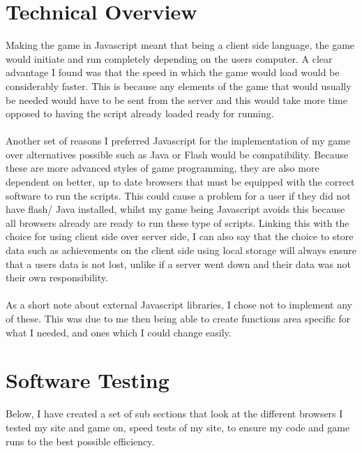 \documentclass[a4paper]{article}
\begin{document}
\section{Technical Overview}
Making the game in Javascript meant that being a client side language, the game
would initiate and run completely depending on the users computer. A clear
advantage I found was that the speed in which the game would load would be
considerably faster. This is because any elements of the game that would usually
be needed would have to be sent from the server and this would take more time
opposed to  having the script already loaded ready for running. \\
\\Another set of reasons I preferred Javascript for the implementation of my
game over alternatives possible such as Java or Flash would be compatibility.
Because these are more advanced styles of game programming, they are also more
dependent on better, up to date browsers that  must be equipped with the correct
software to run the scripts. This could cause a problem for a user if they did
not have flash/ Java installed, whilst my game being Javascript avoids this
because all browsers already are ready to run these type of scripts. Linking
this with the choice for using client side over server side, I can also say that
the choice to store data such as achievements on the client side using local
storage will always ensure that a users data is not lost, unlike if a server
went down and their data was not their own responsibility.\\
\\As a short note about external Javascript libraries, I chose not to implement
any of these. This was due to me then being able to create functions area
specific for what I needed, and ones which I could change easily.

\section{Software Testing}
Below, I have created a set of sub sections that look at the different browsers
I tested my site and game on, speed tests of my site, to ensure my code and game
runs to the best possible efficiency.
\end{document}

